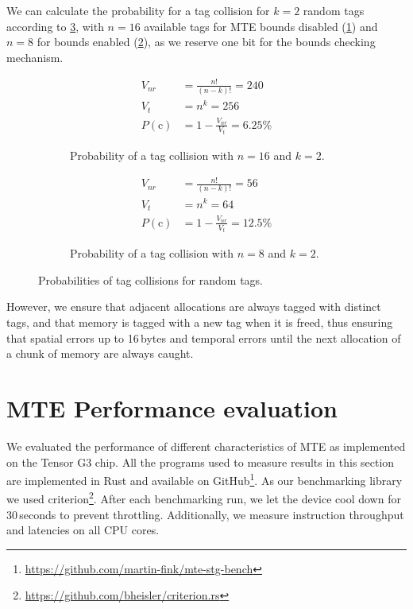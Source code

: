 We can calculate the probability for a tag collision for $k=2$ random tags according to \cref{fig:tag-collision}, with $n=16$ available tags for \ac{MTE} bounds disabled (\cref{fig:tag-collision-16}) and $n=8$ for bounds enabled (\cref{fig:tag-collision-8}), as we reserve one bit for the bounds checking mechanism.

\begin{figure}[h]
    \centering
    \begin{subfigure}[T]{0.45\textwidth}
        \centering
        \begin{align*}
            V_{nr} &= \frac{n!}{(n - k)!} = 240 \\
            V_t &= n^k = 256 \\
            P(\text{c}) &= 1 - \frac{V_{nr}}{V_t} = 6.25\%
        \end{align*}
        \caption{Probability of a tag collision with $n=16$ and $k=2$.}
        \label{fig:tag-collision-16}
    \end{subfigure}
    \hfill
    \begin{subfigure}[T]{0.45\textwidth}
        \centering
        \begin{align*}
            V_{nr} &= \frac{n!}{(n - k)!} = 56 \\
            V_t &= n^k = 64 \\
            P(\text{c}) &= 1 - \frac{V_{nr}}{V_t} = 12.5\%
        \end{align*}
        \caption{Probability of a tag collision with $n=8$ and $k=2$.}
        \label{fig:tag-collision-8}
    \end{subfigure}
    \caption{Probabilities of tag collisions for random tags.}
    \label{fig:tag-collision}
\end{figure}

However, we ensure that adjacent allocations are always tagged with distinct tags, and that memory is tagged with a new tag when it is freed, thus ensuring that spatial errors up to 16\,bytes and temporal errors until the next allocation of a chunk of memory are always caught.


\section{MTE Performance evaluation}
\label{sec:mte-performance-evaluation}

We evaluated the performance of different characteristics of \ac{MTE} as implemented on the Tensor G3 chip.
All the programs used to measure results in this section are implemented in Rust and available on GitHub\footnote{\url{https://github.com/martin-fink/mte-stg-bench}}.
As our benchmarking library we used criterion\footnote{\url{https://github.com/bheisler/criterion.rs}}.
After each benchmarking run, we let the device cool down for 30\,seconds to prevent throttling.
Additionally, we measure instruction throughput and latencies on all CPU cores.

